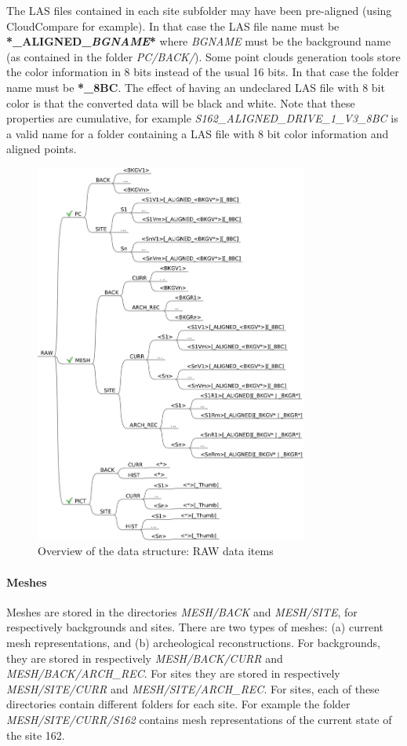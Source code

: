 The LAS files contained in each site subfolder may have been pre-aligned (using CloudCompare for example). In that case the LAS file name must be \textbf{*\_ALIGNED\_\textit{BGNAME}*} where \textit{BGNAME} must be the background name (as contained in the folder \textit{PC/BACK/}).
Some point clouds generation tools store the color information in 8 bits instead of the usual 16 bits. In that case the folder name must be \textbf{*\_8BC}. The effect of having an undeclared LAS file with 8 bit color is that the converted data will be black and white. Note that these properties are cumulative, for example \textit{S162\_ALIGNED\_DRIVE\_1\_V3\_8BC} is a valid name for a folder containing a LAS file with 8 bit color information and aligned points.

\begin{figure}[]
 \centering
 \includegraphics[width=0.8\textwidth]{fig/directory_structure_raw}
 \caption{Overview of the data structure: RAW data items}
 \label{fig:directory_structure_overview_raw}
\end{figure}


\paragraph{Meshes}
Meshes are stored in the directories \textit{MESH/BACK} and \textit{MESH/SITE}, for respectively backgrounds and sites. There are two types of meshes: (a) current  mesh representations, and (b) archeological reconstructions. For backgrounds, they are stored in respectively \textit{MESH/BACK/CURR} and \textit{MESH/BACK/ARCH\_REC}. For sites they are stored in respectively \textit{MESH/SITE/CURR} and \textit{MESH/SITE/ARCH\_REC}. For sites, each of these directories contain different folders for each site. For example the folder \textit{MESH/SITE/CURR/S162} contains mesh representations of the current state of the site 162. 

